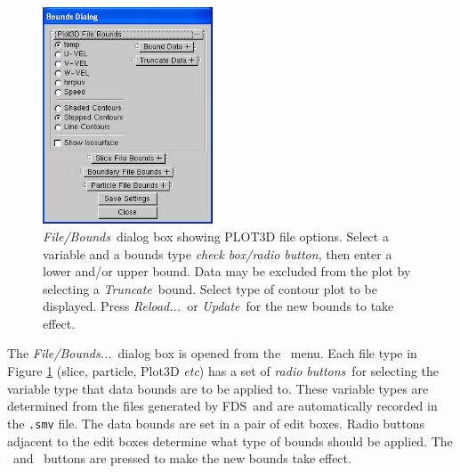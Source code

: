 \documentclass[11pt,twoside]{book}
\newcommand{\figoptions}{hbp}
\newcommand{\fds}{{FDS}}
\newcommand{\etc}{{\em etc}}
\newcommand{\frameit}[1]{\fbox{\tt #1}}
\begin{document}
\begin{figure}[\figoptions]
\centerline{
\includegraphics[width=1.993055in]{figures/figBOUNDSplot3d}
}
\caption[{\em File/Bounds}\ dialog box showing PLOT3D file options.]
{{\em File/Bounds}\ dialog box showing PLOT3D file options. Select a
variable and a bounds type {\em check box/radio button}, then enter
a lower and/or upper bound. Data may be excluded from the plot by
selecting a {\em Truncate}\ bound.  Select type of contour plot to be
displayed. Press {\em Reload...}\ or {\em Update}\ for the new bounds to
take effect.} \label{figBOUNDSplot3d}
\end{figure}

The {\em File/Bounds...}\ dialog box is opened from the
\frameit{Dialogs}\ menu. Each file type in Figure
\ref{figBOUNDSplot3d} (slice, particle, Plot3D \etc) has a set of
{\em radio buttons}\ for selecting the variable type that data bounds
are to be applied to. These variable types are determined from the
files generated by \fds\ and are automatically recorded in the
{\tt .smv} file. The data bounds are set in a pair of edit boxes.
Radio buttons adjacent to the edit boxes determine what type of
bounds should be applied.  The \frameit{Update}\ and
\frameit{Reload}\ buttons are pressed to make the new bounds take
effect.
\end{document}
